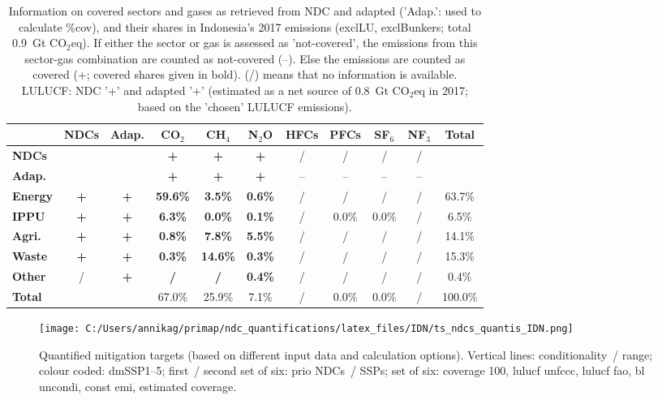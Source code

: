 \documentclass[12pt]{article}
\begin{document}
 \begin{table}[H]\small
 \centering
 \caption{Information on covered sectors and gases as retrieved from NDC and adapted ('Adap.': used to calculate \%cov), and their shares in Indonesia's 2017 emissions (exclLU, exclBunkers; total 0.9~Gt CO$_2$eq).
 If either the sector or gas is assessed as 'not-covered', the emissions from this sector-gas combination are counted as not-covered (--). 
 Else the emissions are counted as covered (+; covered shares given in bold).
 (/) means that no information is available.
 LULUCF: NDC '+' and adapted '+' (estimated as a net source of 0.8~Gt CO$_2$eq in 2017; based on the 'chosen' LULUCF emissions).}
 \label{tab:coveredSectorsGases}
 \begin{tabular}{l || c c || c c c c c c c | c}
 \bfseries  & \bfseries NDCs & \bfseries Adap. & \bfseries CO$_2$ & \bfseries CH$_4$ & \bfseries N$_2$O & \bfseries HFCs & \bfseries PFCs & \bfseries SF$_6$ & \bfseries NF$_3$ & \bfseries Total \tabularnewline \hline \hline
 \bfseries NDCs &  &  & \bfseries + & \bfseries + & \bfseries + & / & / & / & / &  \tabularnewline 
 \bfseries Adap. &  &  & \bfseries + & \bfseries + & \bfseries + & -- & -- & -- & -- &  \tabularnewline \hline \hline
 \bfseries Energy & \bfseries + & \bfseries + & \bfseries 59.6\% & \bfseries 3.5\% & \bfseries 0.6\% & / & / & / & / & 63.7\% \tabularnewline 
 \bfseries IPPU & \bfseries + & \bfseries + & \bfseries 6.3\% & \bfseries 0.0\% & \bfseries 0.1\% & / & 0.0\% & 0.0\% & / & 6.5\% \tabularnewline 
 \bfseries Agri. & \bfseries + & \bfseries + & \bfseries 0.8\% & \bfseries 7.8\% & \bfseries 5.5\% & / & / & / & / & 14.1\% \tabularnewline 
 \bfseries Waste & \bfseries + & \bfseries + & \bfseries 0.3\% & \bfseries 14.6\% & \bfseries 0.3\% & / & / & / & / & 15.3\% \tabularnewline 
 \bfseries Other & / & \bfseries + & \bfseries / & \bfseries / & \bfseries 0.4\% & / & / & / & / & 0.4\% \tabularnewline \hline
 \bfseries Total &  &  & 67.0\% & 25.9\% & 7.1\% & / & 0.0\% & 0.0\% & / & 100.0\% \tabularnewline 
 \end{tabular}
 \end{table}

 \begin{figure}[H]
 \centering
 \texttt{[image: C:/Users/annikag/primap/ndc\_quantifications/latex\_files/IDN/ts\_ndcs\_quantis\_IDN.png]}
 \caption{Quantified mitigation targets (based on different input data and calculation options).
 Vertical lines: conditionality~/ range;
 colour coded: dmSSP1--5;
 first~/ second set of six: prio NDCs~/ SSPs;
 set of six: coverage 100, lulucf unfccc, lulucf fao, bl uncondi, const emi, estimated coverage.}
 \label{fig:miti}
 \end{figure}
\end{document}
